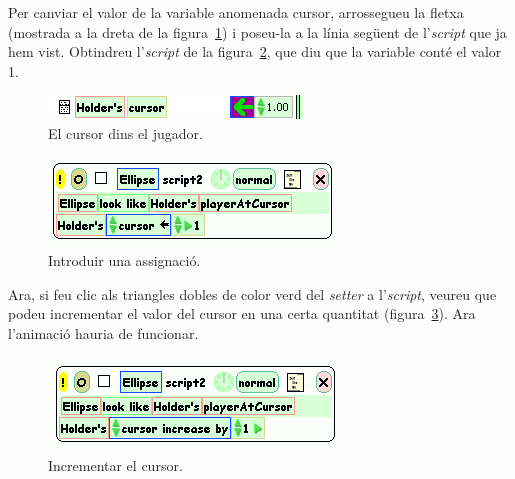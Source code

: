 Per canviar el valor de la variable anomenada \textsf{cursor}, arrossegueu la fletxa (mostrada a la dreta de la figura~\ref{fig2428}) i poseu-la a la línia següent de l'\emph{script} que ja hem vist. Obtindreu l'\emph{script} de la figura~\ref{fig2429}, que diu que la variable conté el valor 1.
\begin{figure}[h!]
\begin{center}
\includegraphics[scale=0.75]{Imatges/figura24-28}
\end{center}
\caption{El cursor dins el jugador.}
\label{fig2428}
\end{figure}
\begin{figure}[h!]
\begin{center}
\includegraphics[scale=0.6]{Imatges/figura24-29}
\end{center}
\caption{Introduir una assignació.}
\label{fig2429}
\end{figure}

Ara, si feu clic als triangles dobles de color verd del \emph{setter} a l'\emph{script}, veureu que podeu incrementar el valor del cursor en una certa quantitat (figura~\ref{fig2430}). Ara l'animació hauria de funcionar.
\begin{figure}[h!]
\begin{center}
\includegraphics[scale=0.6]{Imatges/figura24-30}
\end{center}
\caption{Incrementar el cursor.}
\label{fig2430}
\end{figure}

